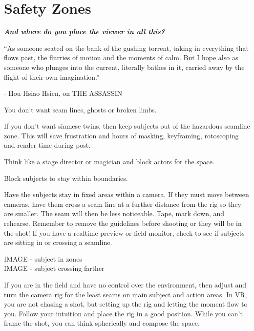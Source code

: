 \chapter{Safety Zones}
\pagecolor{white}
\label{chap:25}
\begin{fullwidth}


{\itshape\bfseries And where do you place the viewer in all this?

“As someone seated on the bank of the gushing torrent, taking in everything that flows past, the flurries of motion and the moments of calm. But I hope also as someone who plunges into the current, literally bathes in it, carried away by the flight of their own imagination.”}

- Hou Hsiao Hsien, on THE ASSASSIN
\vspace{\baselineskip}

\problem

{\large You don’t want seam lines, ghosts or broken limbs.
 \par}

If you don’t want siamese twins, then keep subjects out of the hazardous seamline zone. This will save frustration and hours of masking, keyframing, rotoscoping and render time during post. 

Think like a stage director or magician and block actors for the space. 


\solution

{\large Block subjects to stay within boundaries.

 \par}

Have the subjects stay in fixed areas within a camera. If they must move between cameras, have them cross a seam line at a further distance from the rig so they are smaller. The seam will then be less noticeable. Tape, mark down, and rehearse. Remember to remove the guidelines before shooting or they will be in the shot! If you have a realtime preview or field monitor, check to see if subjects are sitting in or crossing a seamline. 

IMAGE - subject in zones
\\
IMAGE - subject crossing farther

If you are in the field and have no control over the environment, then adjust and turn the camera rig for the least seams on main subject and action areas. In VR, you are not chasing a shot, but setting up the rig and letting the moment flow to you. Follow your intuition and place the rig in a good position. While you can’t frame the shot, you can think spherically and compose the space. 




\clearpage
\end{fullwidth}
